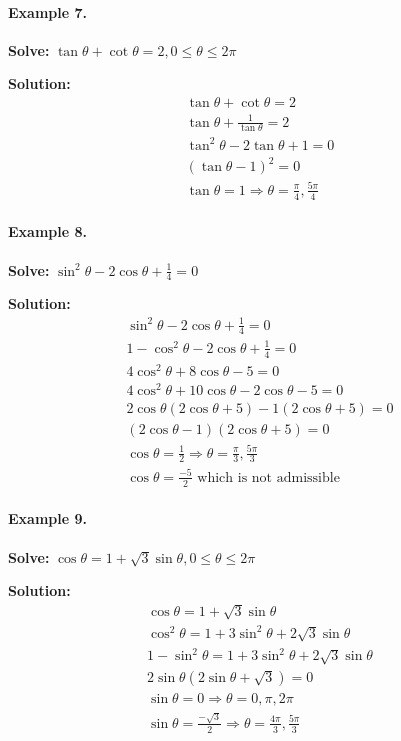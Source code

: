 \documentclass{article}
\begin{document}
\paragraph{Example 7.}
\textbf{Solve:} $\tan\theta + \cot\theta=2, 0 \leq \theta \leq 2\pi$

{\scriptsize \textbf{Solution:}}
\[
  \begin{aligned}
    \tan\theta + \cot\theta=2 \\
    \tan\theta + \frac{1}{\tan\theta}=2 \\
    \tan^{2}\theta - 2 \tan\theta + 1=0 \\
    (\tan\theta - 1)^{2}=0 \\
    \tan\theta =1 \Rightarrow \theta = \frac{\pi}{4}, \frac{5\pi}{4}
  \end{aligned}
\]

\paragraph{Example 8.}
\textbf{Solve:} $\sin^{2}\theta - 2\cos\theta + \frac{1}{4}=0$

{\scriptsize \textbf{Solution:}}
\[
  \begin{aligned}
    \sin^{2}\theta - 2\cos\theta + \frac{1}{4}=0 \\
    1 - \cos^{2}\theta - 2\cos\theta + \frac{1}{4}=0 \\
    4\cos^{2}\theta + 8\cos\theta - 5=0 \\
    4\cos^{2}\theta + 10\cos\theta - 2\cos\theta - 5=0 \\
    2\cos\theta(2\cos\theta+5) - 1(2\cos\theta + 5)=0 \\
    (2\cos\theta-1)(2\cos\theta + 5)=0 \\
    \cos\theta=\frac{1}{2} \Rightarrow \theta = \frac{\pi}{3}, \frac{5\pi}{3} \\
    \cos\theta=\frac{-5}{2} \text{ which is not admissible}
  \end{aligned}
\]

\paragraph{Example 9.}
\textbf{Solve:} $\cos\theta = 1 + \sqrt{3}\sin\theta, 0 \leq \theta \leq 2\pi$

{\scriptsize \textbf{Solution:}}
\[
  \begin{aligned}
    \cos\theta = 1 + \sqrt{3}\sin\theta \\
    \cos^{2}\theta = 1 +3\sin^{2}\theta + 2 \sqrt{3}\sin\theta \\
    1 - \sin^{2}\theta = 1 +3\sin^{2}\theta + 2 \sqrt{3}\sin\theta \\
    2 \sin\theta(2\sin\theta + \sqrt{3}) = 0 \\
    \sin\theta = 0 \Rightarrow \theta = 0, \pi, 2\pi \\
    \sin\theta = \frac{-\sqrt{3}}{2} \Rightarrow \theta = \frac{4\pi}{3}, \frac{5\pi}{3}
  \end{aligned}
\]
\end{document}
